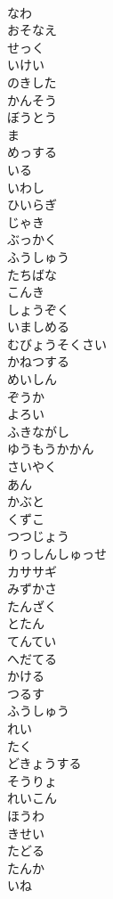 \documentclass[8pt]{extreport}
\begin{document}
\begin{CJK}{UTF8}{min}
\\	なわ
\\	おそなえ
\\	せっく
\\	いけい
\\	のきした
\\	かんそう
\\	ぼうとう
\\	ま
\\	めっする
\\	いる
\\	いわし
\\	ひいらぎ
\\	じゃき
\\	ぶっかく
\\	ふうしゅう
\\	たちばな
\\	こんき
\\	しょうぞく
\\	いましめる
\\	むびょうそくさい
\\	かねつする
\\	めいしん
\\	ぞうか
\\	よろい
\\	ふきながし
\\	ゆうもうかかん
\\	さいやく
\\	あん
\\	かぶと
\\	くずこ
\\	つつじょう
\\	りっしんしゅっせ
\\	カササギ
\\	みずかさ
\\	たんざく
\\	とたん
\\	てんてい
\\	へだてる
\\	かける
\\	つるす
\\	ふうしゅう
\\	れい
\\	たく
\\	どきょうする
\\	そうりょ
\\	れいこん
\\	ほうわ
\\	きせい
\\	たどる
\\	たんか
\\	いね

\end{CJK}
\end{document}
